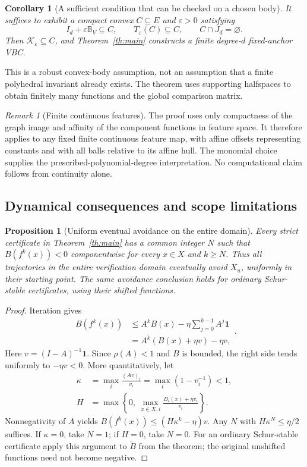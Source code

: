 \documentclass[journal,10pt]{IEEEtran}
\newtheorem{proposition}{Proposition}
\newtheorem{corollary}{Corollary}
\theoremstyle{definition}\newtheorem{definition}{Definition}
\theoremstyle{remark}
\newtheorem*{remark}{Remark}
\newcommand{\one}{\mathbf 1}
\newcommand{\ball}{\mathbb B_V}
\begin{document}
\begin{corollary}[A sufficient condition that can be checked on a chosen body]\label{cor:body}
It suffices to exhibit a compact convex $C\subseteq E$ and $\varepsilon>0$ satisfying
\[
 I_d+\varepsilon\ball\subseteq C,\qquad
 T_\varepsilon(C)\subseteq C,\qquad C\cap J_d=\varnothing.
\]
Then $\mathcal K_\varepsilon\subseteq C$, and Theorem~\ref{th:main} constructs a finite degree-$d$ fixed-anchor VBC.
\end{corollary}
This is a robust convex-body assumption, not an assumption that a finite polyhedral invariant already exists. The theorem uses supporting halfspaces to obtain finitely many functions and the global comparison matrix.

\begin{remark}[Finite continuous features]
The proof uses only compactness of the graph image and affinity of the component functions in feature space. It therefore applies to any fixed finite continuous feature map, with affine offsets representing constants and with all balls relative to its affine hull. The monomial choice supplies the prescribed-polynomial-degree interpretation. No computational claim follows from continuity alone.
\end{remark}

\subsection{Dynamical consequences and scope limitations}\label{sec:limitation}
\begin{proposition}[Uniform eventual avoidance on the entire domain]\label{prop:absorb}
Every strict certificate in Theorem~\ref{th:main} has a common integer $N$ such that $B(f^k(x))<0$ componentwise for every $x\in X$ and $k\geq N$. Thus all trajectories in the entire verification domain eventually avoid $X_u$, uniformly in their starting point. The same avoidance conclusion holds for ordinary Schur-stable certificates, using their shifted functions.
\end{proposition}
\begin{proof}
Iteration gives
\[
\begin{aligned}
 B(f^k(x))&\leq A^kB(x)-\eta\sum_{j=0}^{k-1}A^j\one\\
 &=A^k(B(x)+\eta v)-\eta v,
\end{aligned}.
\]
Here $v=(I-A)^{-1}\one$. Since $\rho(A)<1$ and $B$ is bounded, the right side tends uniformly to $-\eta v<0$. More quantitatively, let
\[
\begin{aligned}
 \kappa&=\max_i\frac{(Av)_i}{v_i}=\max_i(1-v_i^{-1})<1,\\
 H&=\max\left\{0,\ \max_{x\in X,i}\frac{B_i(x)+\eta v_i}{v_i}\right\}.
\end{aligned}
\]
Nonnegativity of $A$ yields $B(f^k(x))\leq(H\kappa^k-\eta)v$. Any $N$ with $H\kappa^N\leq\eta/2$ suffices. If $\kappa=0$, take $N=1$; if $H=0$, take $N=0$. For an ordinary Schur-stable certificate apply this argument to $\widetilde B$ from the theorem; the original unshifted functions need not become negative.
\end{proof}
\end{document}
